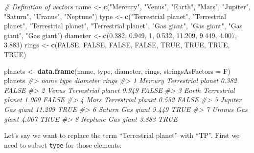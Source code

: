 \documentclass[]{book}
\newenvironment{Shaded}{\begin{snugshade}}{\end{snugshade}}
\newcommand{\CommentTok}[1]{\textcolor[rgb]{0.56,0.35,0.01}{\textit{#1}}}
\newcommand{\DataTypeTok}[1]{\textcolor[rgb]{0.13,0.29,0.53}{#1}}
\newcommand{\DecValTok}[1]{\textcolor[rgb]{0.00,0.00,0.81}{#1}}
\newcommand{\FloatTok}[1]{\textcolor[rgb]{0.00,0.00,0.81}{#1}}
\newcommand{\KeywordTok}[1]{\textcolor[rgb]{0.13,0.29,0.53}{\textbf{#1}}}
\newcommand{\NormalTok}[1]{#1}
\newcommand{\OperatorTok}[1]{\textcolor[rgb]{0.81,0.36,0.00}{\textbf{#1}}}
\newcommand{\OtherTok}[1]{\textcolor[rgb]{0.56,0.35,0.01}{#1}}
\newcommand{\StringTok}[1]{\textcolor[rgb]{0.31,0.60,0.02}{#1}}
\begin{document}
\begin{Shaded}
\begin{Highlighting}[]
\CommentTok{# Definition of vectors}
\NormalTok{name <-}\StringTok{ }\KeywordTok{c}\NormalTok{(}\StringTok{"Mercury"}\NormalTok{, }\StringTok{"Venus"}\NormalTok{, }\StringTok{"Earth"}\NormalTok{, }\StringTok{"Mars"}\NormalTok{, }\StringTok{"Jupiter"}\NormalTok{, }\StringTok{"Saturn"}\NormalTok{, }\StringTok{"Uranus"}\NormalTok{, }\StringTok{"Neptune"}\NormalTok{)}
\NormalTok{type <-}\StringTok{ }\KeywordTok{c}\NormalTok{(}\StringTok{"Terrestrial planet"}\NormalTok{, }\StringTok{"Terrestrial planet"}\NormalTok{, }\StringTok{"Terrestrial planet"}\NormalTok{, }\StringTok{"Terrestrial planet"}\NormalTok{, }\StringTok{"Gas giant"}\NormalTok{, }\StringTok{"Gas giant"}\NormalTok{, }\StringTok{"Gas giant"}\NormalTok{, }\StringTok{"Gas giant"}\NormalTok{)}
\NormalTok{diameter <-}\StringTok{ }\KeywordTok{c}\NormalTok{(}\FloatTok{0.382}\NormalTok{, }\FloatTok{0.949}\NormalTok{, }\DecValTok{1}\NormalTok{, }\FloatTok{0.532}\NormalTok{, }\FloatTok{11.209}\NormalTok{, }\FloatTok{9.449}\NormalTok{, }\FloatTok{4.007}\NormalTok{, }\FloatTok{3.883}\NormalTok{)}
\NormalTok{rings <-}\StringTok{ }\KeywordTok{c}\NormalTok{(}\OtherTok{FALSE}\NormalTok{, }\OtherTok{FALSE}\NormalTok{, }\OtherTok{FALSE}\NormalTok{, }\OtherTok{FALSE}\NormalTok{, }\OtherTok{TRUE}\NormalTok{, }\OtherTok{TRUE}\NormalTok{, }\OtherTok{TRUE}\NormalTok{, }\OtherTok{TRUE}\NormalTok{)}

\NormalTok{planets <-}\StringTok{ }\KeywordTok{data.frame}\NormalTok{(name, type, diameter, rings, }\DataTypeTok{stringsAsFactors =}\NormalTok{ F)}
\NormalTok{planets}
\CommentTok{#>      name               type diameter rings}
\CommentTok{#> 1 Mercury Terrestrial planet    0.382 FALSE}
\CommentTok{#> 2   Venus Terrestrial planet    0.949 FALSE}
\CommentTok{#> 3   Earth Terrestrial planet    1.000 FALSE}
\CommentTok{#> 4    Mars Terrestrial planet    0.532 FALSE}
\CommentTok{#> 5 Jupiter          Gas giant   11.209  TRUE}
\CommentTok{#> 6  Saturn          Gas giant    9.449  TRUE}
\CommentTok{#> 7  Uranus          Gas giant    4.007  TRUE}
\CommentTok{#> 8 Neptune          Gas giant    3.883  TRUE}
\end{Highlighting}
\end{Shaded}

Let's say we want to replace the term ``Terrestrial planet'' with ``TP''. First we need to subset \texttt{type} for those elements:

\begin{Shaded}
\end{Shaded}
\end{document}
